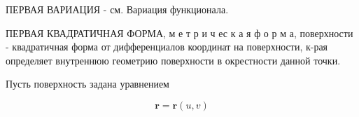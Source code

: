 \documentclass[10pt]{article}
\begin{document}
ПЕРВАЯ ВАРИАЦИЯ - см. Вариация функционала.



ПЕРВАЯ КВАДРАТИЧНАЯ ФОРМА, м е т р и ч ес к а я ф о р м а, поверхности - квадратичная форма от дифференциалов координат на поверхности, к-рая определяет внутреннюю геометрию поверхности в окрестности данной точки.



Пусть поверхность задана уравнением



\[

\boldsymbol{r}=\boldsymbol{r}(u, v)

\]
\end{document}
